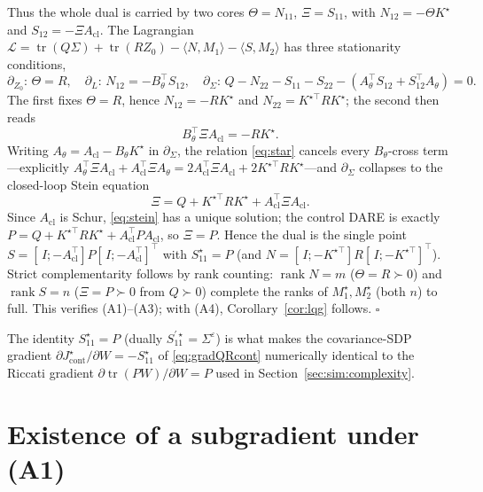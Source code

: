 \documentclass[twocolumn,amsthm]{autart}
\begin{document}
Thus the whole dual is carried by two cores $\Theta=N_{11}$, $\Xi=S_{11}$, with
$N_{12}=-\Theta K^\star$ and $S_{12}=-\Xi A_{\mathrm{cl}}$. The Lagrangian
$\mathcal L=\operatorname{tr}(Q\Sigma)+\operatorname{tr}(RZ_0)-\langle N,M_1\rangle
-\langle S,M_2\rangle$ has three stationarity conditions,
\begin{equation}\label{eq:kkt}
\partial_{Z_0}\!:\,\Theta=R,\quad
\partial_{L}\!:\,N_{12}=-B_\theta^\top S_{12},\quad
\partial_{\Sigma}\!:\,Q-N_{22}-S_{11}-S_{22}-(A_\theta^\top S_{12}+S_{12}^\top A_\theta)=0.
\end{equation}
The first fixes $\Theta=R$, hence $N_{12}=-RK^\star$ and $N_{22}=K^{\star\top}RK^\star$;
the second then reads
\begin{equation}\label{eq:star}
B_\theta^\top\Xi A_{\mathrm{cl}}=-RK^\star .
\end{equation}
Writing $A_\theta=A_{\mathrm{cl}}-B_\theta K^\star$ in $\partial_\Sigma$, the
relation \eqref{eq:star} cancels every $B_\theta$-cross term---explicitly
$A_\theta^\top\Xi A_{\mathrm{cl}}+A_{\mathrm{cl}}^\top\Xi A_\theta=
2A_{\mathrm{cl}}^\top\Xi A_{\mathrm{cl}}+2K^{\star\top}RK^\star$---and
$\partial_\Sigma$ collapses to the closed-loop Stein equation
\begin{equation}\label{eq:stein}
\Xi=Q+K^{\star\top}RK^\star+A_{\mathrm{cl}}^\top\Xi A_{\mathrm{cl}} .
\end{equation}
Since $A_{\mathrm{cl}}$ is Schur, \eqref{eq:stein} has a unique solution; the control
DARE is exactly $P=Q+K^{\star\top}RK^\star+A_{\mathrm{cl}}^\top PA_{\mathrm{cl}}$, so
$\Xi=P$. Hence the dual is the single point $S=[\,I;-A_{\mathrm{cl}}^\top]P[\,I;
-A_{\mathrm{cl}}^\top]^\top$ with $S_{11}^\star=P$ (and $N=[\,I;-K^{\star\top}]R[\,I;
-K^{\star\top}]^\top$). Strict complementarity follows by rank counting:
$\operatorname{rank}N=m$ ($\Theta=R\succ0$) and $\operatorname{rank}S=n$
($\Xi=P\succ0$ from $Q\succ0$) complete the ranks of $M_1^\star,M_2^\star$ (both $n$)
to full. This verifies (A1)--(A3); with (A4), Corollary~\ref{cor:lqg} follows.
\hfill$\square$

The identity $S_{11}^\star=P$ (dually $S_{11}^{\prime\star}=\Sigma^\varepsilon$) is
what makes the covariance-SDP gradient $\partial J_{\mathrm{cont}}^\star/\partial W=
-S_{11}^\star$ of \eqref{eq:gradQRcont} numerically identical to the Riccati gradient
$\partial\operatorname{tr}(PW)/\partial W=P$ used in
Section~\ref{sec:sim:complexity}.

\section{Existence of a subgradient under (A1)}\label{app:subgrad}
\end{document}

